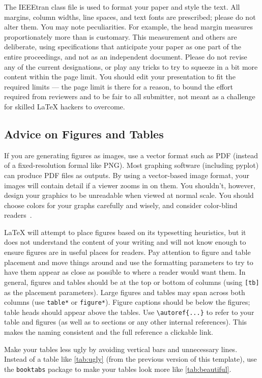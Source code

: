 \documentclass[compsoc, conference, a4paper, 10pt, times]{IEEEtran}
\begin{document}
The IEEEtran class file is used to format your paper and style the text. All margins,  column widths, line spaces, and text fonts are prescribed; please do not  alter them. You may note peculiarities. For example, the head margin measures proportionately more than is customary. This measurement 
and others are deliberate, using specifications that anticipate your paper as one part of the entire proceedings, and not as an independent document. Please do not revise any of the current designations, or play any tricks to try to squeeze in a bit more content within the page limit. You should edit your presentation to fit the required limits --- the page limit is there for a reason, to bound the effort required from reviewers and to be fair to all submitter, not meant as a challenge for skilled LaTeX hackers to overcome.

\subsection{Advice on Figures and Tables}

If you are generating figures as images, use a vector format such as PDF (instead of a fixed-resolution formal like PNG). Most graphing software (including pyplot) can produce PDF files as outputs. By using a vector-based image format, your images will contain detail if a viewer zooms in on them. You shouldn't, however, design your graphics to be unreadable when viewed at normal scale. You should choose colors for your graphs carefully and wisely, and consider color-blind readers~\cite{katsnelson2021colour}.

LaTeX will attempt to place figures based on its typesetting heuristics, but it does not understand the content of your writing and will not know enough to ensure figures are in useful places for readers. Pay attention to figure and table placement and move things around and use the formatting parameters to try to have them appear as close as possible to where a reader would want them. In general, figures and tables should be at the top or bottom of columns (using \verb|[tb]| as the placement parameters). Large figures and tables may span across both columns (use \verb|table*| or \verb|figure*|). Figure captions should be below the figures; table heads should appear above the tables. Use \verb|\autoref{...}| to refer to your table and figures (as well as to sections or any other internal references). This makes the naming consistent and the full reference a clickable link.

Make your tables less ugly by avoiding vertical bars and unnecessary lines. Instead of a table like \autoref{tab:ugly} (from the previous version of this template), use the \verb|booktabs| package to make your tables look more like \autoref{tab:beautiful}.
\end{document}
